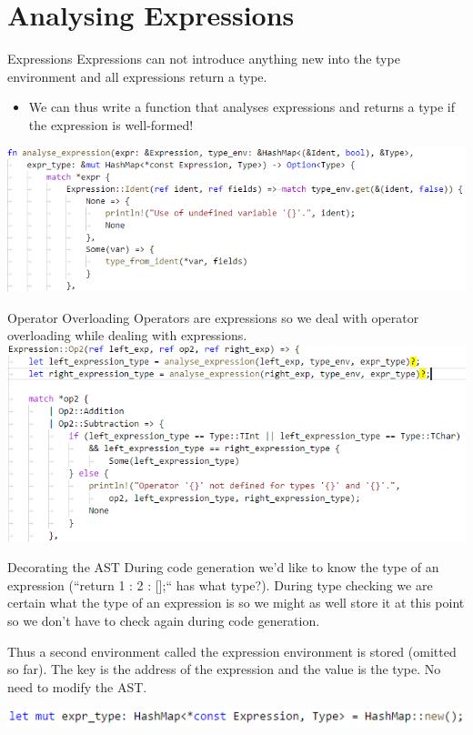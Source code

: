 \documentclass[10pt]{beamer}
\begin{document}
\section{Analysing Expressions}
\begin{frame}{Expressions}
    Expressions can not introduce anything new into the type environment and all expressions return a type.
        \begin{itemize}
            \item We can thus write a function that analyses expressions and returns a type if the expression is well-formed!
        \end{itemize}
    \includegraphics[width=\textwidth]{presentation2/expr_ident.png}
\end{frame}

\begin{frame}{Operator Overloading}
    Operators are expressions so we deal with operator overloading while dealing with expressions.
    \includegraphics[width=\textwidth]{presentation2/expr_op2.png}
\end{frame}

\begin{frame}{Decorating the AST}
    During code generation we'd like to know the type of an expression (``return 1 : 2 : [];`` has what type?). During type checking we are certain what the type of an expression is so we might as well store it at this point so we don't have to check again during code generation.

    Thus a second environment called the expression environment is stored (omitted so far). The key is the address of the expression and the value is the type. No need to modify the AST.
    
    \includegraphics[width=\textwidth]{presentation2/expr_type.png}
\end{frame}
\end{document}
